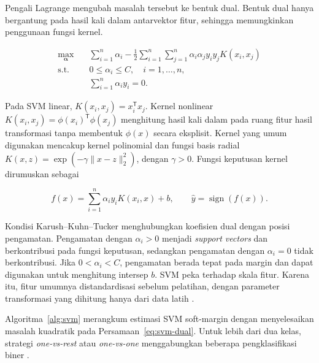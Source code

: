 Pengali Lagrange mengubah masalah tersebut ke bentuk dual. Bentuk dual hanya bergantung pada hasil kali dalam antarvektor fitur, sehingga memungkinkan penggunaan fungsi kernel.

\begin{equation}
    \begin{aligned}
        \max_{\boldsymbol{\alpha}}\quad & \sum_{i=1}^{n}\alpha_i-\frac{1}{2}\sum_{i=1}^{n}\sum_{j=1}^{n}\alpha_i\alpha_jy_iy_jK(x_i,x_j) \\
        \text{s.t.}\quad                & 0\leq\alpha_i\leq C,\quad i=1,\ldots,n,                                                        \\
                                        & \sum_{i=1}^{n}\alpha_i y_i=0.
    \end{aligned}
    \label{eq:svm-dual}
\end{equation}

Pada SVM linear, $K(x_i,x_j)=x_i^{\mathsf{T}}x_j$. Kernel nonlinear $K(x_i,x_j)=\phi(x_i)^{\mathsf{T}}\phi(x_j)$ menghitung hasil kali dalam pada ruang fitur hasil transformasi tanpa membentuk $\phi(x)$ secara eksplisit. Kernel yang umum digunakan mencakup kernel polinomial dan fungsi basis radial $K(x,z)=\exp(-\gamma\|x-z\|_2^2)$, dengan $\gamma>0$. Fungsi keputusan kernel dirumuskan sebagai

\begin{equation}
    f(x)=\sum_{i=1}^{n}\alpha_i y_i K(x_i,x)+b,
    \qquad \hat{y}=\operatorname{sign}(f(x)).
    \label{eq:svm-kernel-decision}
\end{equation}

Kondisi Karush--Kuhn--Tucker menghubungkan koefisien dual dengan posisi pengamatan. Pengamatan dengan $\alpha_i>0$ menjadi \textit{support vectors} dan berkontribusi pada fungsi keputusan, sedangkan pengamatan dengan $\alpha_i=0$ tidak berkontribusi. Jika $0<\alpha_i<C$, pengamatan berada tepat pada margin dan dapat digunakan untuk menghitung intersep $b$. SVM peka terhadap skala fitur. Karena itu, fitur umumnya distandardisasi sebelum pelatihan, dengan parameter transformasi yang dihitung hanya dari data latih \cite{james2021islr,scikitlearn_preprocessing}.

Algoritma~\ref{alg:svm} merangkum estimasi SVM soft-margin dengan menyelesaikan masalah kuadratik pada Persamaan~\ref{eq:svm-dual}. Untuk lebih dari dua kelas, strategi \textit{one-vs-rest} atau \textit{one-vs-one} menggabungkan beberapa pengklasifikasi biner \cite{scikitlearn_userguide}.

